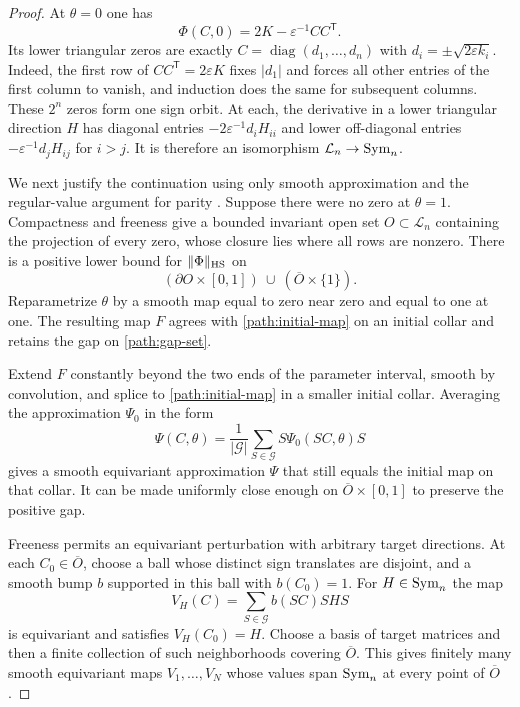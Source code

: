 \begin{proof}
At $\theta=0$ one has
\begin{equation}\label{path:initial-map}
                     \Phi(C,0)=2K-\varepsilon^{-1}CC^{\mathsf T}.
\end{equation}
Its lower triangular zeros are exactly
$C=\operatorname{diag}(d_1,\ldots,d_n)$ with
$d_i=\pm\sqrt{2\varepsilon k_i}$.  Indeed, the first row of
$CC^{\mathsf T}=2\varepsilon K$ fixes $|d_1|$ and forces all
other entries of the first column to vanish, and induction does
the same for subsequent columns.  These $2^n$ zeros form one
sign orbit.  At each, the derivative in a lower triangular
direction $H$ has diagonal entries
$-2\varepsilon^{-1}d_i H_{ii}$ and lower off-diagonal entries
$-\varepsilon^{-1}d_j H_{ij}$ for $i>j$.  It is therefore an
isomorphism $\mathcal L_n\to\operatorname{Sym}_n$.

We next justify the continuation using only smooth approximation
and the regular-value argument for parity
\cite[Sections~2--4]{Milnor1965}.  Suppose there were no zero at
$\theta=1$.  Compactness and freeness give a bounded invariant
open set $O\subset\mathcal L_n$ containing the projection of
every zero, whose closure lies where all rows are nonzero.
There is a positive lower bound for $\|\Phi\|_{\mathrm{HS}}$ on
\begin{equation}\label{path:gap-set}
       (\partial O\times[0,1])\ \cup\ (\overline O\times\{1\}).
\end{equation}
Reparametrize $\theta$ by a smooth map equal to zero near zero
and equal to one at one.  The resulting map $F$ agrees with
\eqref{path:initial-map} on an initial collar and retains the gap
on \eqref{path:gap-set}.

Extend $F$ constantly beyond the two ends of the parameter
interval, smooth by convolution, and splice to
\eqref{path:initial-map} in a smaller initial collar.
Averaging the approximation $\Psi_0$ in the form
\[
       \Psi(C,\theta)=\frac1{|\mathcal G|}
                  \sum_{S\in\mathcal G}S\Psi_0(SC,\theta)S
\]
gives a smooth equivariant approximation $\Psi$ that still equals
the initial map on that collar.  It can be made uniformly close
enough on $\overline O\times[0,1]$ to preserve the positive gap.

Freeness permits an equivariant perturbation with arbitrary target
directions.  At each $C_0\in\overline O$, choose a ball whose
distinct sign translates are disjoint, and a smooth bump $b$
supported in this ball with $b(C_0)=1$.  For $H\in\operatorname{Sym}_n$ the map
\[
                        V_H(C)=\sum_{S\in\mathcal G}b(SC)SHS
\]
is equivariant and satisfies $V_H(C_0)=H$.
Choose a basis of target matrices and then a finite collection of
such neighborhoods covering $\overline O$.  This gives finitely
many smooth equivariant maps $V_1,\ldots,V_N$ whose values span
$\operatorname{Sym}_n$ at every point of $\overline O$.


\end{proof}

